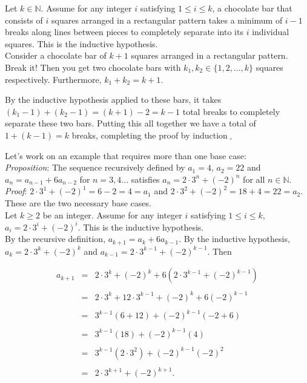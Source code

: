 \documentclass[12pt]{amsart}
\theoremstyle{definition}
\theoremstyle{remark}
\newcommand{\nats}{\mathbb N}
\begin{document}
Let $k\in\nats$.  Assume for any integer $i$ satisfying $1\leq i\leq k$, a chocolate bar that consists of $i$ squares arranged in a rectangular
pattern takes a minimum of $i-1$ breaks along lines between pieces to completely separate into its $i$ individual squares.  This is the inductive hypothesis.\\

Consider a chocolate bar of $k+1$ squares arranged in a rectangular pattern.  Break it!  Then you get two chocolate bars with $k_{1},k_{2}\in\{1,2,...,k\}$ squares respectively.  Furthermore, $k_{1}+k_{2}=k+1$.


By the inductive hypothesis applied to these bars, it takes $(k_{1}-1)+(k_{2}-1)=(k+1)-2=k-1$ total breaks to completely separate these two bars.  Putting this all together we have a total of $1+(k-1)=k$ breaks, completing the proof by induction$\;_{\square}$

\newpage

Let's work on an example that requires more than one base case:\\

\emph{Proposition}:  The sequence recursively defined by $a_1=4$, $a_2=22$ and $a_n=a_{n-1}+6a_{n-2}$ for $n=3,4...$ satisfies $a_n=2\cdot 3^n+(-2)^n$ for all $n\in\nats$.\\

\emph{Proof}:  $2\cdot 3^1+(-2)^1=6-2=4=a_1$ and $2\cdot 3^2+(-2)^2=18+4=22=a_2$.  These are the two necessary base cases.\\

Let $k\geq 2$ be an integer.  Assume for any integer $i$ satisfying $1\leq i\leq k$, $a_i=2\cdot 3^i+(-2)^i$.  This is the inductive hypothesis.\\

By the recursive definition, $a_{k+1}=a_k+6a_{k-1}$.  By the inductive hypothesis, $a_k=2\cdot 3^k+(-2)^k$ and $a_{k-1}=2\cdot 3^{k-1}+(-2)^{k-1}$.  Then



\begin{eqnarray*}
a_{k+1} &=& 2\cdot 3^k+(-2)^k+6(2\cdot 3^{k-1}+(-2)^{k-1}) \\
\\
&=& 2\cdot 3^k+12\cdot 3^{k-1}+(-2)^k+6(-2)^{k-1}  \\
\\
&=& 3^{k-1}(6+12)+(-2)^{k-1}(-2+6) \\
\\
&=& 3^{k-1}(18)+(-2)^{k-1}(4)  \\
\\
&=& 3^{k-1}(2\cdot 3^2)+(-2)^{k-1}(-2)^2  \\
\\
&=& 2\cdot 3^{k+1}+(-2)^{k+1}.\end{eqnarray*}
\end{document}
